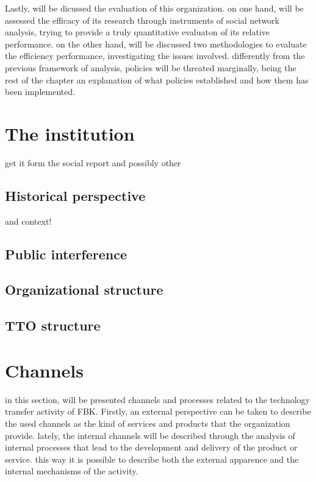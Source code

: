 Lastly, will be dicussed the evaluation of this organization. on one hand, will be assessed the efficacy of its research  through instruments of social network analysis, trying to provide a truly quantitative evaluaton of its relative performance. on the other hand, will be discussed two methodologies to evaluate the efficiency performance, investigating the issues involved. differently from the previous framework of analysis, policies will be threated marginally, being the rest of the chapter an explanation of what policies established and how them has been implemented. 

\section{The institution}

get it form the social report and possibly other

\subsection{Historical perspective}

and context!

\subsection{Public interference}
\subsection{Organizational structure}
\subsection{TTO structure}

\section{Channels}

in this section, will be presented channels and processes related to the technology transfer activity of FBK. Firstly, an external perspective can be taken to describe the used channels as the kind of services and products that the organization provide. lately, the internal channels will be described through the analysis of internal processes that lead to the development and delivery of the product or service. this way it is possible to describe both the external apparence and the internal mechanisms of the activity. 

